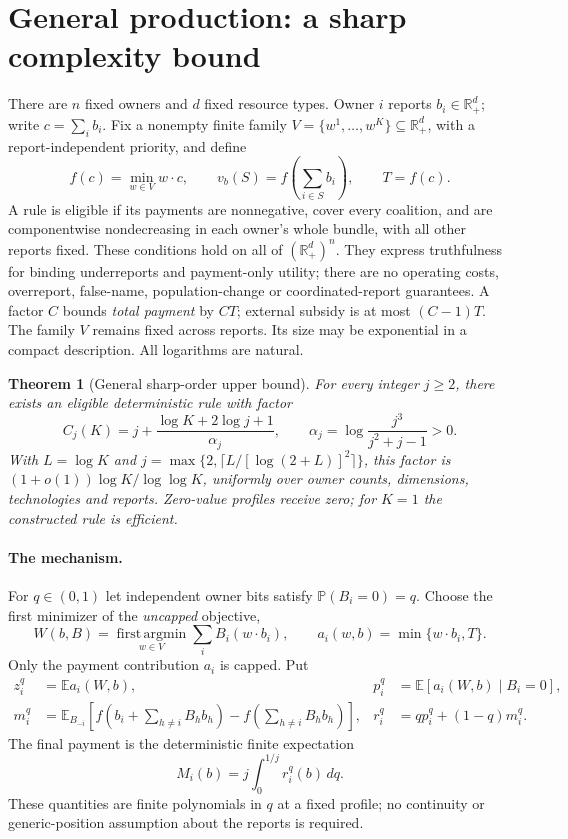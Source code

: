 \documentclass[11pt]{article}
\newtheorem{theorem}{Theorem}[section]
\theoremstyle{definition}\newtheorem{definition}[theorem]{Definition}
\theoremstyle{remark}\newtheorem{remark}[theorem]{Remark}
\newcommand{\R}{\mathbb R}
\newcommand{\E}{\mathbb E}
\newcommand{\Prob}{\mathbb P}
\begin{document}
\section{General production: a sharp complexity bound}\label{prod:section}
There are $n$ fixed owners and $d$ fixed resource types. Owner $i$ reports
$b_i\in\R_+^d$; write $c=\sum_i b_i$. Fix a nonempty finite family
$V=\{w^1,\ldots,w^K\}\subseteq\R_+^d$, with a report-independent priority,
and define
\[
 f(c)=\min_{w\in V}w\cdot c,\qquad
 v_b(S)=f\left(\sum_{i\in S}b_i\right),\qquad T=f(c).
\]
A rule is eligible if its payments are nonnegative, cover every coalition,
and are componentwise nondecreasing in each owner's whole bundle, with all
other reports fixed. These conditions hold on all of $(\R_+^d)^n$.
They express truthfulness for binding underreports and payment-only utility;
there are no operating costs, overreport, false-name, population-change or
coordinated-report guarantees. A factor $C$ bounds \emph{total payment} by
$CT$; external subsidy is at most $(C-1)T$. The family $V$ remains fixed
across reports. Its size may be exponential in a compact description. All logarithms are natural.

\begin{theorem}[General sharp-order upper bound]\label{prod:upper}
For every integer $j\ge2$, there exists an eligible deterministic rule with factor
\begin{equation}\label{prod:constant}
 C_j(K)=j+\frac{\log K+2\log j+1}{\alpha_j},\qquad
 \alpha_j=\log\frac{j^3}{j^2+j-1}>0.
\end{equation}
With $L=\log K$ and
$j=\max\{2,\lceil L/[\log(2+L)]^2\rceil\}$, this factor is
$(1+o(1))\log K/\log\log K$, uniformly over owner counts, dimensions,
technologies and reports. Zero-value profiles receive zero; for $K=1$ the
constructed rule is efficient.
\end{theorem}

\paragraph{The mechanism.}
For $q\in(0,1)$ let independent owner bits satisfy $\Prob(B_i=0)=q$.
Choose the first minimizer of the \emph{uncapped} objective,
\[
 W(b,B)=\operatorname*{first\,argmin}_{w\in V}
               \sum_i B_i(w\cdot b_i),\qquad
 a_i(w,b)=\min\{w\cdot b_i,T\}.
\]
Only the payment contribution $a_i$ is capped. Put
\begin{align}
 z_i^q&=\E a_i(W,b),&
 p_i^q&=\E[a_i(W,b)\mid B_i=0],\label{prod:p}\\
 m_i^q&=\E_{B_{-i}}\left[f\left(b_i+\sum_{h\ne i}B_hb_h\right)
                         -f\left(\sum_{h\ne i}B_hb_h\right)\right],
 &r_i^q&=qp_i^q+(1-q)m_i^q.\label{prod:hybrid}
\end{align}
The final payment is the deterministic finite expectation
\begin{equation}\label{prod:payment}
 M_i(b)=j\int_0^{1/j}r_i^q(b)\,dq.
\end{equation}
These quantities are finite polynomials in $q$ at a fixed profile; no
continuity or generic-position assumption about the reports is required.
\end{document}

